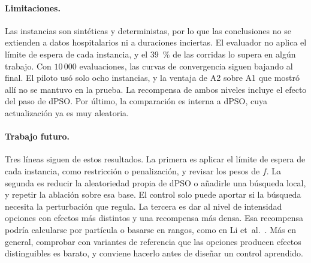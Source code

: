 \documentclass[10pt,a4paper]{article}
\begin{document}
\paragraph{Limitaciones.}
Las instancias son sintéticas y deterministas, por lo que las conclusiones no se extienden a
datos hospitalarios ni a duraciones inciertas. El evaluador no aplica el límite de espera de
cada instancia, y el 39~\% de las corridas lo supera en algún trabajo. Con $10\,000$
evaluaciones, las curvas de convergencia siguen bajando al final. El piloto usó solo ocho
instancias, y la ventaja de A2 sobre A1 que mostró allí no se mantuvo en la prueba. La recompensa
de ambos niveles incluye el efecto del paso de dPSO. Por último, la comparación es interna a
dPSO, cuya actualización ya es muy aleatoria.

\paragraph{Trabajo futuro.}
Tres líneas siguen de estos resultados. La primera es aplicar el límite de espera de cada
instancia, como restricción o penalización, y revisar los pesos de $f$. La segunda es reducir la
aleatoriedad propia de dPSO o añadirle una búsqueda local, y repetir la ablación sobre esa base.
El control solo puede aportar si la búsqueda necesita la perturbación que regula. La tercera es
dar al nivel de intensidad opciones con efectos más distintos y una recompensa más densa. Esa
recompensa podría calcularse por partícula o basarse en rangos, como en Li et~al.~\cite{li2014}. Más en general,
comprobar con variantes de referencia que las opciones producen efectos distinguibles es barato,
y conviene hacerlo antes de diseñar un control aprendido.
\end{document}
